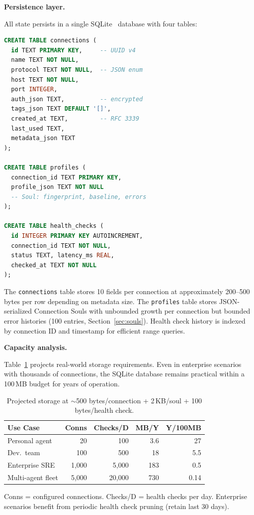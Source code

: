 \documentclass[10pt, twocolumn]{article}
\begin{document}

\textbf{Persistence layer.}

All state persists in a single SQLite~\cite{sqlite2024} database with four tables:

\begin{lstlisting}[language=SQL, caption={Core schema (simplified).}]
CREATE TABLE connections (
  id TEXT PRIMARY KEY,     -- UUID v4
  name TEXT NOT NULL,
  protocol TEXT NOT NULL,  -- JSON enum
  host TEXT NOT NULL,
  port INTEGER,
  auth_json TEXT,          -- encrypted
  tags_json TEXT DEFAULT '[]',
  created_at TEXT,         -- RFC 3339
  last_used TEXT,
  metadata_json TEXT
);

CREATE TABLE profiles (
  connection_id TEXT PRIMARY KEY,
  profile_json TEXT NOT NULL
  -- Soul: fingerprint, baseline, errors
);

CREATE TABLE health_checks (
  id INTEGER PRIMARY KEY AUTOINCREMENT,
  connection_id TEXT NOT NULL,
  status TEXT, latency_ms REAL,
  checked_at TEXT NOT NULL
);
\end{lstlisting}

The \texttt{connections} table stores 10 fields per connection at approximately 200--500 bytes per row depending on metadata size. The \texttt{profiles} table stores JSON-serialized Connection Souls with unbounded growth per connection but bounded error histories (100 entries, Section~\ref{sec:souls}). Health check history is indexed by connection ID and timestamp for efficient range queries.

\textbf{Capacity analysis.}

Table~\ref{tab:capacity} projects real-world storage requirements. Even in enterprise scenarios with thousands of connections, the SQLite database remains practical within a 100\,MB budget for years of operation.

\begin{table}[h]
\caption{Projected storage at $\sim$500 bytes/connection + 2\,KB/soul + 100 bytes/health check.}
\label{tab:capacity}
\centering
\scriptsize
\begin{tabular}{@{}lrrrr@{}}
\toprule
\textbf{Use Case} & \textbf{Conns} & \textbf{Checks/D} & \textbf{MB/Y} & \textbf{Y/100MB} \\
\midrule
Personal agent & 20 & 100 & 3.6 & 27 \\
Dev.\ team & 100 & 500 & 18 & 5.5 \\
Enterprise SRE & 1{,}000 & 5{,}000 & 183 & 0.5 \\
Multi-agent fleet & 5{,}000 & 20{,}000 & 730 & 0.14 \\
\bottomrule
\end{tabular}
\vspace{2pt}

\noindent\scriptsize Conns = configured connections. Checks/D = health checks per day. Enterprise scenarios benefit from periodic health check pruning (retain last 30 days).
\end{table}
\end{document}
